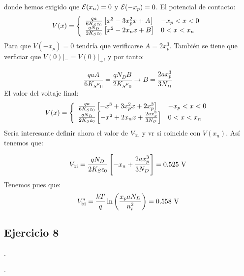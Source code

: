 donde hemos exigido que $\mathcal{E}(x_n)=0$ y $\mathcal{E}(-x_p)=0$. El potencial de contacto:
\begin{equation*}
    V (x) =  \left\lbrace \begin{array}{ll}
        \frac{qa}{6K_S\varepsilon_0} \left[ x^3 - 3x_p^2 x + A \right] & -x_p < x < 0  \\ 
        \frac{qN_D}{2K_S\varepsilon_0} \left[ x^2 - 2x_n x + B \right] & 0 < x < x_n  
    \end{array} \right.
\end{equation*} 
Para que $V(-x_p)=0$ tendría que verificarse $A=2x_p^3$. También se tiene que verficiar que $V(0)|_{-}=V(0)|_{+}$, y por tanto: 

\begin{equation*}
    \frac{qa A}{6K_S\varepsilon_0} = \frac{qN_D B}{2K_S\varepsilon_0} \rightarrow B = \frac{2 a x_p^3}{3 N_D}
\end{equation*}
El valor del voltaje final: 
\begin{equation*}
    V (x) =  \left\lbrace \begin{array}{ll}
        \frac{qa}{6K_S\varepsilon_0} \left[ -x^3 + 3x_p^2 x + 2x_p^3 \right] & -x_p < x < 0  \\ 
        \frac{qN_D}{2K_S\varepsilon_0} \left[ -x^2 + 2x_n x + \frac{2 a x_p^3}{3 N_D} \right] & 0 < x < x_n  
    \end{array} \right.
\end{equation*}
Sería interesante definir ahora el valor de $V_{\text{bi}}$ y vr si coincide con $V(x_n)$. Así tenemos que:

\begin{equation}
    \Vbi = \frac{qN_D}{2K_S\epsilon_0} \ccorchetes{-x_n+\frac{2ax_p^3}{3N_D}} = 0.525 \ \unit{V}
\end{equation}
Tenemos pues que: 
\begin{equation}
    \Vbi^* = \frac{kT}{q} \ln \parentesis{\frac{x_p a N_D}{n_i^2}} = 0.558 \ \unit{V}
\end{equation}



\begin{Enunciado}
	\subsection*{Ejercicio 8}
	\lipsum[1].
\end{Enunciado}
\vspace*{1em}
\lipsum[1].
\vspace*{2em}

